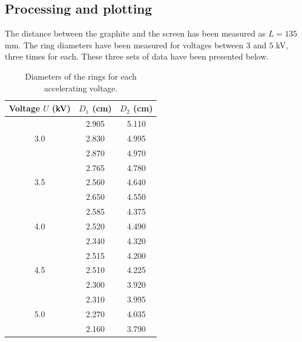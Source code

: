 \documentclass[11pt]{article}
\begin{document}
        \subsection{Processing and plotting}
        The distance between the graphite and the screen has been measured as $L = 135$ mm.
        The ring diameters have been measured for voltages between $3$ and $5$ kV, three times for each. These three sets of data
        have been presented below.
        \begin{table}[H]
                \centering
                \caption{Diameters of the rings for each accelerating voltage.}
                \label{tab:diameters}
                \begin{tabular}{c|c|c}\hline
                Voltage $U$ (kV)        & $D_1$ (cm)    &  $D_2$ (cm)          \\\hline\hline
                                        & 2.905         &  5.110               \\
                3.0                     & 2.830         &  4.995               \\
                                        & 2.870         &  4.970               \\\hline
                                        & 2.765         &  4.780               \\
                3.5                     & 2.560         &  4.640               \\
                                        & 2.650         &  4.550               \\\hline
                                        & 2.585         &  4.375               \\
                4.0                     & 2.520         &  4.490               \\
                                        & 2.340         &  4.320               \\\hline
                                        & 2.515         &  4.200               \\
                4.5                     & 2.510         &  4.225               \\
                                        & 2.300         &  3.920               \\\hline
                                        & 2.310         &  3.995               \\
                5.0                     & 2.270         &  4.035               \\
                                        & 2.160         &  3.790               \\\hline
                \end{tabular}
        \end{table}
\end{document}
